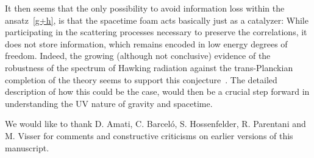 \documentclass[prd, groupedaddress, showpacs, showkeys, onecolumn, nofootinbib]{revtex4}
\begin{document}
It then seems that the only possibility to avoid information loss within the ansatz~\eqref{g+h}, is that the spacetime foam acts basically just as a catalyzer: While participating in the scattering processes necessary to preserve the correlations, it does not store information, which remains encoded in low energy degrees of freedom.  Indeed, the growing (although not conclusive) evidence of the robustness of the spectrum of Hawking radiation against  the trans-Planckian completion of the theory seems to support this conjecture~\cite{Unruh:1980cg,Unruh:1994je,Brout:1995wp,Corley:1996ar,Barrabes:1998iw,Parentani:1999qv,Barrabes:2000fr,Parentani:2000ts,Parentani:2007mb,Unruh:2004zk}. The detailed description of how this could be the case, would then be a crucial step forward in understanding the UV nature of gravity and spacetime.

\acknowledgments
We would like to thank D. Amati, C. Barcel\'o, S. Hossenfelder, R. Parentani and M. Visser for comments and constructive criticisms on earlier versions of this manuscript. 
\end{document}

